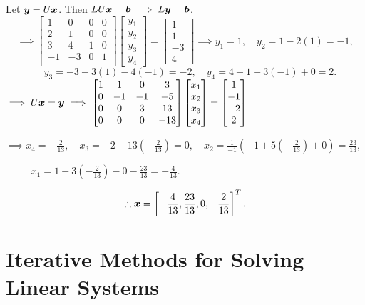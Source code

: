 \begin{solution}[8.0cm]
\noindent
Let $\boldsymbol{y} = U\boldsymbol{x}$. Then $LU\boldsymbol{x} = \boldsymbol{b} \implies L\boldsymbol{y} = \boldsymbol{b}$.
\[
\implies
\begin{bmatrix}
1 & 0 & 0 & 0\\
2 & 1 & 0 & 0\\
3 & 4 & 1 & 0\\
-1 & -3 & 0 & 1\\
\end{bmatrix}
\begin{bmatrix}
y_1 \\ y_2 \\ y_3 \\ y_4
\end{bmatrix}
=
\begin{bmatrix}
1 \\ 1 \\ -3 \\ 4
\end{bmatrix}
\implies
 y_1=1,
 \quad y_2=1-2(1)=-1,
\]
\[
 \quad y_3=-3-3(1)-4(-1)=-2,
 \quad y_4=4+1+3(-1)+0=2.
\]
\(
\implies U\boldsymbol{x} = \boldsymbol{y} \implies
\begin{bmatrix}
1 & 1 & 0 & 3\\
0 & -1 & -1 & -5\\
0 & 0 & 3 & 13\\
0 & 0 & 0 & -13\\
\end{bmatrix}
\begin{bmatrix}
x_1 \\ x_2 \\ x_3 \\ x_4
\end{bmatrix}
=
\begin{bmatrix}
1 \\ -1 \\ -2 \\ 2
\end{bmatrix}
\)

\smallskip
\noindent
\(\displaystyle
\implies
 x_4=-\frac2{13},
 \quad x_3=-2-13\left(-\frac{2}{13}\right)=0,
 \quad x_2=\frac1{-1}\left(-1+5\left(-\frac2{13}\right)+0\right)=\frac{23}{13},
\)

\smallskip
\noindent
\(\displaystyle
\; \; \qquad x_1=1-3\left(-\frac2{13}\right)-0-\frac{23}{13}=-\frac4{13}.
\)

\[
 \therefore \boldsymbol{x}=\left[-\frac4{13},\frac{23}{13},0,-\frac2{13}\right]^T.
\]
\end{solution}

\section{Iterative Methods for Solving Linear Systems}

